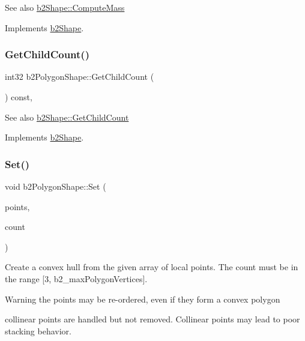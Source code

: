 \begin{DoxySeeAlso}{See also}
\mbox{\hyperlink{classb2Shape_a61b365526241b47f124789b0309cac69}{b2\+Shape\+::\+Compute\+Mass}} 
\end{DoxySeeAlso}


Implements \mbox{\hyperlink{classb2Shape_a61b365526241b47f124789b0309cac69}{b2\+Shape}}.

\mbox{\label{classb2PolygonShape_aa8bb0d5a88624104425cdee0b2f4427a}} 
\subsubsection{\texorpdfstring{Get\+Child\+Count()}{GetChildCount()}}
{\footnotesize\ttfamily int32 b2\+Polygon\+Shape\+::\+Get\+Child\+Count (\begin{DoxyParamCaption}{ }\end{DoxyParamCaption}) const\hspace{0.3cm}{\ttfamily [override]}, {\ttfamily [virtual]}}

\begin{DoxySeeAlso}{See also}
\mbox{\hyperlink{classb2Shape_a05a3c445017d96df9238ceefe6ce37ab}{b2\+Shape\+::\+Get\+Child\+Count}} 
\end{DoxySeeAlso}


Implements \mbox{\hyperlink{classb2Shape_a05a3c445017d96df9238ceefe6ce37ab}{b2\+Shape}}.

\mbox{\label{classb2PolygonShape_a4d7b35550509f570814b97325a68966b}} 
\subsubsection{\texorpdfstring{Set()}{Set()}}
{\footnotesize\ttfamily void b2\+Polygon\+Shape\+::\+Set (\begin{DoxyParamCaption}\item[{const \mbox{\hyperlink{structb2Vec2}{b2\+Vec2}} $\ast$}]{points,  }\item[{int32}]{count }\end{DoxyParamCaption})}

Create a convex hull from the given array of local points. The count must be in the range \mbox{[}3, b2\+\_\+max\+Polygon\+Vertices\mbox{]}. \begin{DoxyWarning}{Warning}
the points may be re-\/ordered, even if they form a convex polygon 

collinear points are handled but not removed. Collinear points may lead to poor stacking behavior. 
\end{DoxyWarning}
\mbox{\label{classb2PolygonShape_a6bb90df8b4a40d1c53b64cc352a855dd}} 
